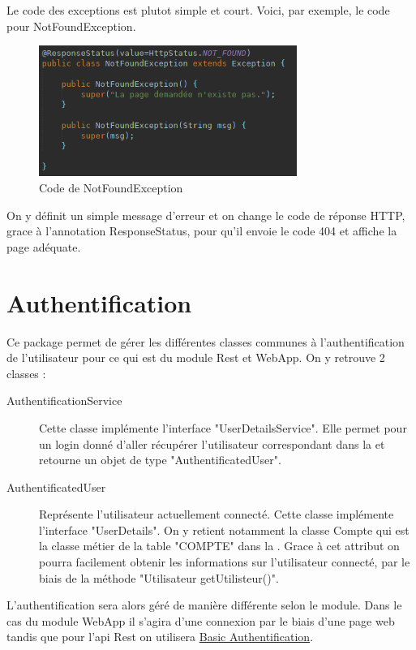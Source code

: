 		Le code des exceptions est plutot simple et court. Voici, par exemple, le code pour NotFoundException.

		\begin{figure}[H]
			\centering\includegraphics[width=0.75\textwidth, keepaspectratio]{res/NotFoundException.png}
			\caption{Code de NotFoundException}
		\end{figure}

		On y définit un simple message d'erreur et on change le code de réponse HTTP, grace à l'annotation ResponseStatus, pour qu'il envoie le code 404 et affiche la page adéquate.

	\section{Authentification}

		Ce package permet de gérer les différentes classes communes à l'authentification de l'utilisateur pour ce qui est du module Rest et WebApp. On y retrouve 2 classes :

		\begin{description}
		   \item[AuthentificationService]{Cette classe implémente l'interface "UserDetailsService". Elle permet pour un login donné d'aller récupérer l'utilisateur correspondant dans la \bdd{} et retourne un objet de type "AuthentificatedUser".}
		   \item[AuthentificatedUser]{Représente l'utilisateur actuellement connecté. Cette classe implémente l'interface "UserDetails". On y retient notamment la classe Compte qui est la classe métier de la table "COMPTE" dans la \bdd{}. Grace à cet attribut on pourra facilement obtenir les informations sur l'utilisateur connecté, par le biais de la méthode "Utilisateur getUtilisteur()".}
	   \end{description}

	   L'authentification sera alors géré de manière différente selon le module. Dans le cas du module WebApp il s'agira d'une connexion par le biais d'une page web tandis que pour l'api Rest on utilisera \href{https://fr.wikipedia.org/wiki/Authentification\_HTTP#M%C3%A9thode\_%C2%AB\_Basic\_%C2%BB}{Basic Authentification}.

